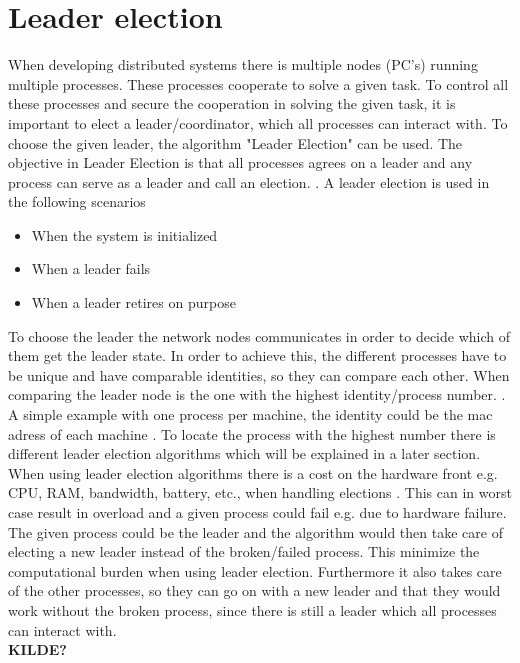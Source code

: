 \documentclass[Main]{subfiles}
\begin{document}
\section{Leader election}
When developing distributed systems there is multiple nodes (PC's) running multiple processes. These processes cooperate to solve a given task. To control all these processes and secure the cooperation in solving the given task, it is important to elect a leader/coordinator, which all processes can interact with. To choose the given leader, the algorithm "Leader Election" can be used.  The objective in Leader Election is that all processes agrees on a leader and any process can serve as a leader and call an election. \cite{RMI-slides}. A leader election is used in the following scenarios
\begin{itemize}
\item When the system is initialized
\item When a leader fails
\item When a leader retires on purpose
\end{itemize}
To choose the leader the network nodes communicates in order to decide which of them get the leader state. In order to achieve this, the different processes have to be unique and have comparable identities, so they can compare  each other. When comparing the leader node is the one with the highest identity/process number. \cite{wiki-Leader}. A simple example with one process per machine, the identity could be the mac adress of each machine \cite{ElectionAlgorithm}.
To locate the process with the highest number there is different leader election algorithms which will be explained in a later section.\\

When using leader election algorithms there is a cost on the hardware front e.g. CPU, RAM, bandwidth, battery, etc., when handling elections \cite{RMI-slides}. This can in worst case result in overload and a given process could fail e.g. due to hardware failure. The given process could be the leader and the algorithm would then take care of electing a new leader instead of the broken/failed process. This minimize the computational burden when using leader election. Furthermore it also takes care of the other processes, so they can go on with a new leader and that they would work without the broken process, since there is still a leader which all processes can interact with.\\\textbf{KILDE?}
\end{document}
